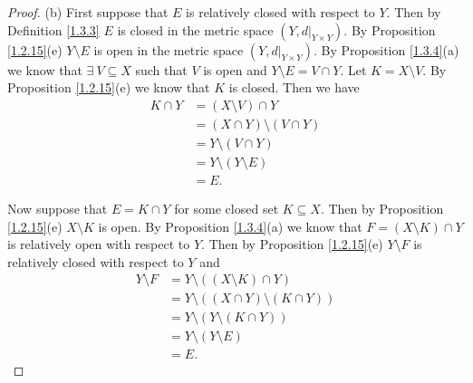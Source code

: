 \begin{proof}{(b)}
    First suppose that \(E\) is relatively closed with respect to \(Y\).
    Then by Definition \ref{1.3.3} \(E\) is closed in the metric space \((Y, d|_{Y \times Y})\).
    By Proposition \ref{1.2.15}(e) \(Y \setminus E\) is open in the metric space \((Y, d|_{Y \times Y})\).
    By Proposition \ref{1.3.4}(a) we know that \(\exists\ V \subseteq X\) such that \(V\) is open and \(Y \setminus E = V \cap Y\).
    Let \(K = X \setminus V\).
    By Proposition \ref{1.2.15}(e) we know that \(K\) is closed.
    Then we have
    \begin{align*}
        K \cap Y & = (X \setminus V) \cap Y          \\
                 & = (X \cap Y) \setminus (V \cap Y) \\
                 & = Y \setminus (V \cap Y)          \\
                 & = Y \setminus (Y \setminus E)     \\
                 & = E.
    \end{align*}

    Now suppose that \(E = K \cap Y\) for some closed set \(K \subseteq X\).
    Then by Proposition \ref{1.2.15}(e) \(X \setminus K\) is open.
    By Proposition \ref{1.3.4}(a) we know that \(F = (X \setminus K) \cap Y\) is relatively open with respect to \(Y\).
    Then by Proposition \ref{1.2.15}(e) \(Y \setminus F\) is relatively closed with respect to \(Y\) and
    \begin{align*}
        Y \setminus F & = Y \setminus ((X \setminus K) \cap Y)          \\
                      & = Y \setminus ((X \cap Y) \setminus (K \cap Y)) \\
                      & = Y \setminus (Y \setminus (K \cap Y))          \\
                      & = Y \setminus (Y \setminus E)                   \\
                      & = E.
    \end{align*}
\end{proof}